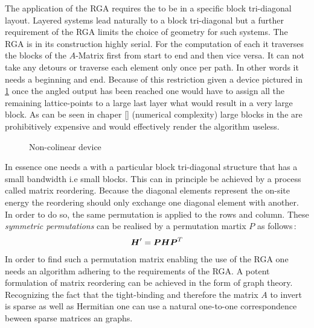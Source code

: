 The application of the RGA requires the \hamil{} to be in a specific block tri-diagonal layout. Layered systems lead naturally to a block tri-diagonal \hamil{} but a further requirement of the RGA limits the choice of geometry for such systems. The RGA is in its construction highly serial. For the computation of each \gfnc{} it traverses the blocks of the $A$-Matrix first from start to end and then vice versa. It can not take any detours or traverse each element only once per path. In other words it needs a beginning and end. Because of this restriction given a device pictured in \ref{fig:noncolinear} once the angled output has been reached one would have to assign all the remaining lattice-points to a large last layer what would result in a very large block. As can be seen in chaper \ref{} (numerical complexity) large blocks in the \hamil{} are prohibitively expensive and would effectively render the algorithm useless.
\begin{figure}[!ht]
\caption{Non-colinear device}
\label{fig:noncolinear}
\end{figure}
In essence one needs a \hamil{} with a particular block tri-diagonal structure that has a small bandwidth  i.e small blocks. This can in principle be achieved by a process called matrix reordering. Because the diagonal elements represent the on-site energy the reordering should only exchange one diagonal element with another. In order to do so, the same permutation is applied to the rows and column. These \emph{symmetric permutations} can be realised by a permutation martix $P$ as follows\,\cite{saad2003iterative}:
\begin{align}
\boldsymbol{H}' = \boldsymbol{P} \boldsymbol{H} \boldsymbol{P}^{T}
\label{eqn:permutation}
\end{align}
In order to find such a permutation matrix enabling the use of the RGA one needs an algorithm adhering to the requirements of the RGA.
A potent formulation of matrix reordering can be achieved in the form of graph theory. Recognizing the fact that the tight-binding \hamil{} and therefore the matrix $A$ to invert is sparse as well as Hermitian one can use a natural one-to-one correspondence beween sparse matrices an graphs.
